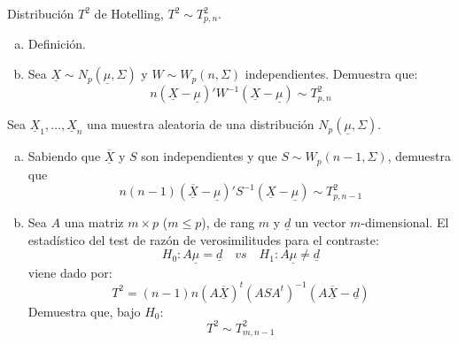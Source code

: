 \documentclass[twoside]{article}
\newcommand{\media}[1]{{\overline{#1}}}
\newcommand{\muestra}[1]{{\underline{#1}}}
\newcommand{\m}[1]{{\muestra{#1}}}
\newcommand{\mX}{{\muestra{X}}}
\begin{document}
\begin{ejercicio}{1.4}
Distribución $T^2$ de Hotelling, $T^2 \sim T^2_{p,n}$.
\begin{enumerate}[(a)]
\item Definición.
\item Sea $\mX \sim N_p(\m{μ},Σ)$ y $W \sim W_p(n,Σ)$ independientes. Demuestra que:
\[ n(\mX-\m{μ})' W^{-1} (\mX-\m{μ}) \sim T^2_{p,n} \]
\end{enumerate}
\end{ejercicio}

\newpage

\begin{ejercicio}{1.5}
Sea $\mX_1,\dots,\mX_n$ una muestra aleatoria de una distribución $N_p(\m{μ},Σ)$.
\begin{enumerate}[(a)]
\item Sabiendo que $\media{\mX}$ y $S$ son independientes y que $S \sim W_p(n-1,Σ)$, demuestra que
\[ n(n-1)(\media{\mX}-\m{μ})' S^{-1} (\mX-\m{μ}) \sim T^2_{p,n-1}\]
\item Sea $A$ una matriz $m\times p$ ($m≤p$), de rang $m$ y $\m{d}$ un vector $m$-dimensional.
El estadístico del test de razón de verosimilitudes para el contraste:
\[ H_0 \colon A\m{μ} = \m{d} \quad vs \quad H_1 \colon A\m{μ} \neq \m{d} \]
viene dado por:
\[ T^2 = (n-1)n (A\media{\mX})^t (ASA^t)^{-1} (A \media{\mX}-\m{d}) \]
Demuestra que, bajo $H_0$:
\[ T^2 \sim T^2_{m,n-1} \]
\end{enumerate}
\end{ejercicio}
\end{document}
